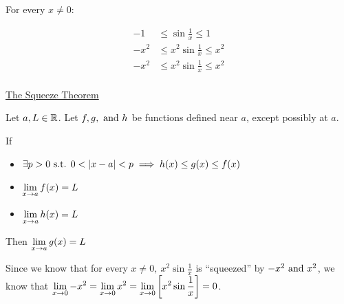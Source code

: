 For every \(x \neq 0\):

\begin{align*}
-1 &\leq \sin \frac{1}{x} \leq 1 \\
-x^{2} &\leq x^{2} \sin \frac{1}{x} \leq x^{2} \\
-x^{2} &\leq x^{2} \sin \frac{1}{x} \leq x^{2} \\
\end{align*}

\begin{center}
\end{center}

\begin{mdframed}
  \underline{The Squeeze Theorem}

  Let \(a, L \in \mathbb{R}\). Let \(f, g, \text{ and } h\) be functions defined near \(a\), except possibly at \(a\).

  If
  \begin{itemize}
    \item \(\displaystyle \exists p > 0 \text{ s.t. } 0 < \left|x - a\right| < p \implies h(x) \leq g(x) \leq f(x)\)
    \item \(\displaystyle \lim_{x \to a} f(x) = L\)
    \item \(\displaystyle \lim_{x \to a} h(x) = L\)
  \end{itemize}
  Then \(\displaystyle \lim_{x \to a} g(x) = L\)
\end{mdframed}

Since we know that for every \(x \neq 0,~x^{2} \sin \frac{1}{x}\) is ``squeezed'' by \(-x^{2} \text{ and } x^{2}\), we know that \(\displaystyle \lim_{x \to 0} -x^{2} = \lim_{x \to 0} x^{2} = \lim_{x \to 0} \left[x^{2} \sin \frac{1}{x}\right] = 0\).

